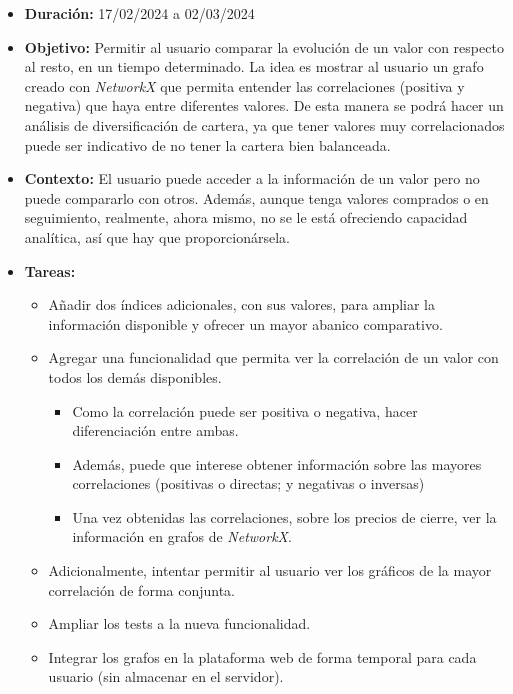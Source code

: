 \begin{itemize}
\item  
\textbf{Duración:} 17/02/2024 a 02/03/2024

\item
\textbf{Objetivo:} Permitir al usuario comparar la evolución de un valor con respecto al resto, en un tiempo determinado. La idea es mostrar al usuario un grafo creado con \emph{NetworkX}\citep{online:networkx} que permita entender las correlaciones (positiva y negativa) que haya entre diferentes valores. De esta manera se podrá hacer un análisis de diversificación de cartera, ya que tener valores muy correlacionados puede ser indicativo de no tener la cartera bien balanceada. 

\item
\textbf{Contexto:} El usuario puede acceder a la información de un valor pero no puede compararlo con otros. Además, aunque tenga valores comprados o en seguimiento, realmente, ahora mismo, no se le está ofreciendo capacidad analítica, así que hay que proporcionársela. 


\item
\textbf{Tareas:}
	\begin{itemize}
	\tightlist
	\item 
	Añadir dos índices adicionales, con sus valores, para ampliar la información disponible y ofrecer un mayor abanico comparativo. 
	\item
	Agregar una funcionalidad que permita ver la correlación de un valor con todos los demás disponibles. 
		\begin{itemize}
		\tightlist
		\item 
		Como la correlación puede ser positiva o negativa, hacer diferenciación entre ambas. 
		\item
		Además, puede que interese obtener información sobre las mayores correlaciones (positivas o directas; y negativas o inversas)
		\item
		Una vez obtenidas las correlaciones, sobre los precios de cierre, ver la información en grafos de \emph{NetworkX}. 
		\end{itemize}
	\item
	Adicionalmente, intentar permitir al usuario ver los gráficos de la mayor correlación de forma conjunta. 
	\item
	Ampliar los tests a la nueva funcionalidad. 
	\item
	Integrar los grafos en la plataforma web de forma temporal para cada usuario (sin almacenar en el servidor).
  	\end{itemize}
\end{itemize}


